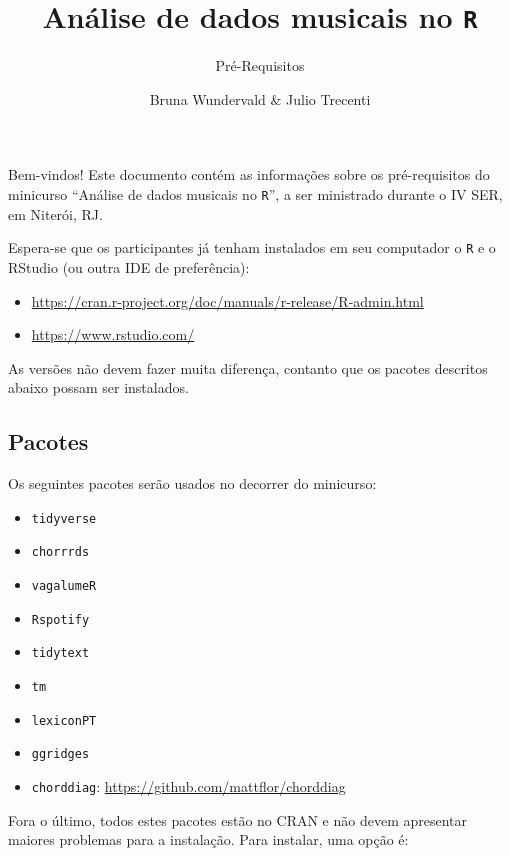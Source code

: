 \documentclass[]{article}
\title{Análise de dados musicais no \texttt{R}}
\subtitle{Pré-Requisitos}
\author{Bruna Wundervald \& Julio Trecenti}
\date{}
\providecommand{\tightlist}{%
  \setlength{\itemsep}{0pt}\setlength{\parskip}{0pt}}
\begin{document}
\maketitle

Bem-vindos! Este documento contém as informações sobre os pré-requisitos
do minicurso ``Análise de dados musicais no \texttt{R}'', a ser
ministrado durante o IV SER, em Niterói, RJ.

Espera-se que os participantes já tenham instalados em seu computador o
\texttt{R} e o RStudio (ou outra IDE de preferência):

\begin{itemize}
\tightlist
\item
  \url{https://cran.r-project.org/doc/manuals/r-release/R-admin.html}
\item
  \url{https://www.rstudio.com/}
\end{itemize}

As versões não devem fazer muita diferença, contanto que os pacotes
descritos abaixo possam ser instalados.

\hypertarget{pacotes}{%
\subsection{Pacotes}\label{pacotes}}

Os seguintes pacotes serão usados no decorrer do minicurso:

\begin{itemize}
\tightlist
\item
  \texttt{tidyverse}
\item
  \texttt{chorrrds}
\item
  \texttt{vagalumeR}
\item
  \texttt{Rspotify}
\item
  \texttt{tidytext}
\item
  \texttt{tm}
\item
  \texttt{lexiconPT}
\item
  \texttt{ggridges}
\item
  \texttt{chorddiag}: \url{https://github.com/mattflor/chorddiag}
\end{itemize}

Fora o último, todos estes pacotes estão no CRAN e não devem apresentar
maiores problemas para a instalação. Para instalar, uma opção é:
\end{document}
